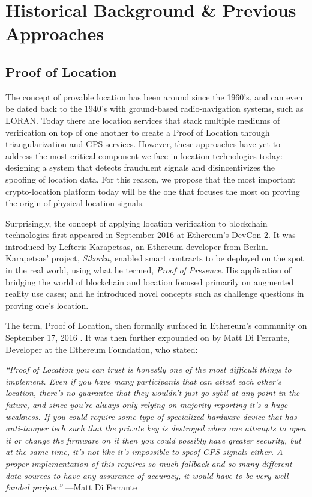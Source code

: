 \documentclass{article}
\begin{document}
\section{Historical Background \& Previous Approaches}
\subsection{Proof of Location}

The concept of provable location has been around since the 1960's, and can even be dated back to the 1940's with ground-based radio-navigation systems, such as LORAN. Today there are location services that stack multiple mediums of verification on top of one another to create a Proof of Location through triangularization and GPS services. However, these approaches have yet to address the most critical component we face in location technologies today: designing a system that detects fraudulent signals and disincentivizes the spoofing of location data. For this reason, we propose that the most important crypto-location platform today will be the one that focuses the most on proving the origin of physical location signals.

Surprisingly, the concept of applying location verification to blockchain technologies first appeared in September 2016 at Ethereum's DevCon 2. It was introduced by Lefteris Karapetsas, an Ethereum developer from Berlin. Karapetsas' project, \textit{Sikorka}, enabled smart contracts to be deployed on the spot in the real world, using what he termed, \textit{Proof of Presence}. His application of bridging the world of blockchain and location focused primarily on augmented reality use cases; and he introduced novel concepts such as challenge questions in proving one's location.

The term, Proof of Location, then formally surfaced in Ethereum's community on September 17, 2016 \cite{diferrante-proofoflocation}. It was then further expounded on by Matt Di Ferrante, Developer at the Ethereum Foundation, who stated:

\begin{displayquote}\textit{``Proof of Location you can trust is honestly one of the most difficult things to implement. Even if you have many participants that can attest each other's location, there's no guarantee that they wouldn't just go sybil at any point in the future, and since you're always only relying on majority reporting it's a huge weakness.
If you could require some type of specialized hardware device that has anti-tamper tech such that the private key is destroyed when one attempts to open it or change the firmware on it then you could possibly have greater security, but at the same time, it's not like it's impossible to spoof GPS signals either.
A proper implementation of this requires so much fallback and so many different data sources to have any assurance of accuracy, it would have to be very well funded project.''}
\vspace{2mm}
---Matt Di Ferrante
\end{displayquote}
\end{document}
